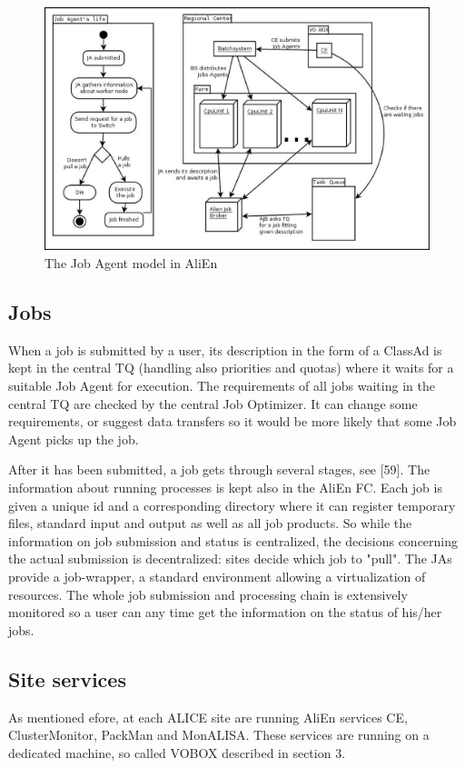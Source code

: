 \documentclass{intech}
\begin{document}
\begin{figure}[htb] %
\centering
\includegraphics[width=13cm]{fig17.eps} %
\caption{The Job Agent model in AliEn}\label{fig17}
\end{figure}



\subsection{Jobs}
%
When a job is submitted by a user, its description in the form of a
ClassAd is kept in the central TQ (handling also priorities and
quotas) where it waits for a suitable Job Agent for execution.  The
requirements of all jobs waiting in the central TQ are checked by
the central Job Optimizer. It can change some requirements, or
suggest data transfers so it would be more likely that some Job
Agent picks up the job.

After it has been submitted, a job gets through several stages, see
[59].  The information about running processes is kept also in the
AliEn FC. Each job is given a unique id and a corresponding
directory where it can register temporary files, standard input and
output as well as all job products. So while the information on job
submission and status is centralized, the decisions concerning the
actual submission is decentralized: sites decide which job to
"pull". The JAs provide a job-wrapper, a standard environment
allowing a virtualization of resources. The whole job submission and
processing chain is extensively monitored so a user can any time get
the information on the status of his/her jobs.

\subsection{Site services}
%
As mentioned efore, at each ALICE site are
running AliEn services CE, ClusterMonitor, PackMan and MonALISA.
These services are running on a dedicated machine, so called VOBOX
described in section 3.
\end{document}
